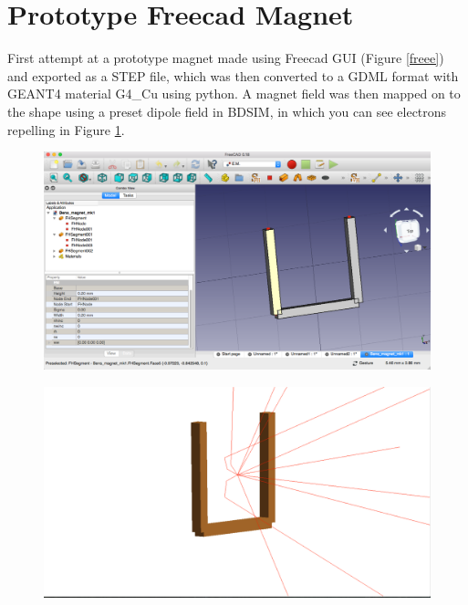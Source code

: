 \documentclass[12pt,a4paper]{article}
\begin{document}
\small


\section{Prototype Freecad Magnet}
\label{mag}
First attempt at a prototype magnet made using Freecad GUI (Figure \ref{freee}) and exported as a STEP file, which was then converted to a GDML format with GEANT4 material G4\_Cu using python. A magnet field was then mapped on to the shape using a preset dipole field in BDSIM, in which you can see electrons repelling in Figure \ref{repel}.

\begin{figure}[h!]
\centering
\begin{minipage}{.5\textwidth}
  \centering
  \includegraphics[height=0.5\linewidth]{Images//CAD_Mag//maginfreecad.png}
  \label{freee}
\end{minipage}%
\begin{minipage}{.5\textwidth}
  \centering
  \includegraphics[height=.5\linewidth]{Images//CAD_Mag//maginbdsim.png}
  \label{repel}
\end{minipage}%
\end{figure}
\end{document}
